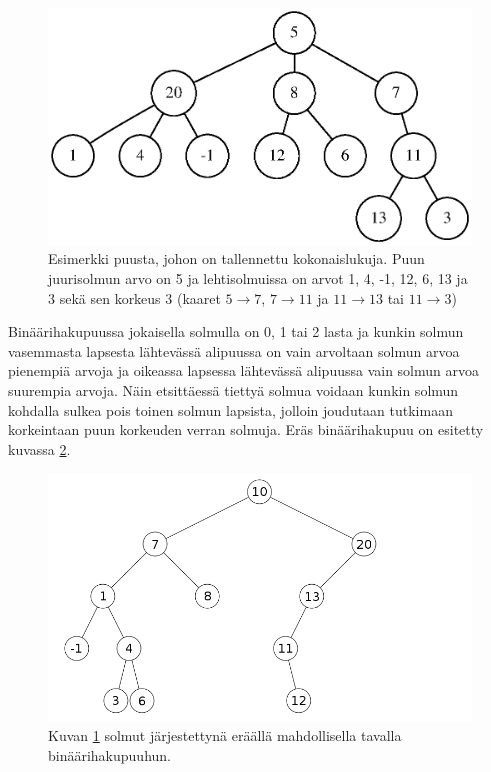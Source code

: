\documentclass[12pt,a4paper,titlepage]{article}
\begin{document}
\begin{figure}[h]
\centering
\includegraphics[width=13cm]{graphs/puu.eps}
\caption{Esimerkki puusta, johon on tallennettu kokonaislukuja. Puun juurisolmun arvo on 5 ja lehtisolmuissa on arvot 1, 4, -1, 12, 6, 13 ja 3 sekä sen korkeus 3 (kaaret $5 \rightarrow 7$, $7 \rightarrow 11$ ja $11 \rightarrow 13$ tai $11 \rightarrow 3$)}
\label{yleinenpuu}
\end{figure}

Binäärihakupuussa jokaisella solmulla on 0, 1 tai 2 lasta ja kunkin solmun vasemmasta lapsesta lähtevässä alipuussa on vain arvoltaan solmun arvoa pienempiä arvoja ja oikeassa lapsessa lähtevässä alipuussa vain solmun arvoa suurempia arvoja. Näin etsittäessä tiettyä solmua voidaan kunkin solmun kohdalla sulkea pois toinen solmun lapsista, jolloin joudutaan tutkimaan korkeintaan puun korkeuden verran solmuja. Eräs binäärihakupuu on esitetty kuvassa \ref{binaaripuu}. \cite{cormen}

\begin{figure}[H]
\centering
\includegraphics[width=15cm]{kuvat/binaaripuu.png}
\caption{Kuvan \ref{yleinenpuu} solmut järjestettynä eräällä mahdollisella tavalla binäärihakupuuhun.}
\label{binaaripuu}
\end{figure}
\end{document}
